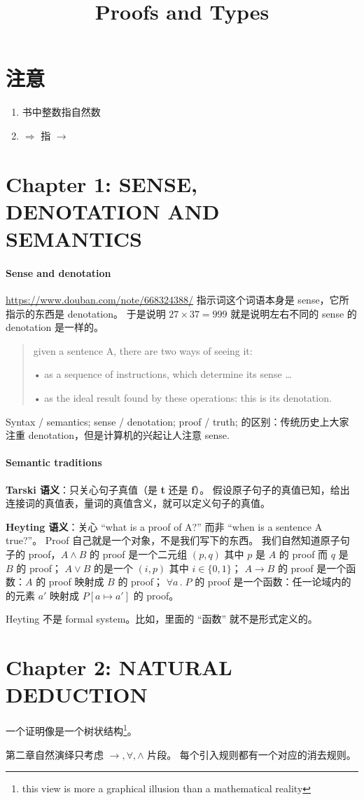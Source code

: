 \documentclass[a4paper]{article}
\title{Proofs and Types}
\author{}
\begin{document}
\maketitle

\section{注意}
\begin{enumerate}
	\item 书中整数指自然数
	\item $\Rightarrow$ 指 $\to$
\end{enumerate}

\section{Chapter 1: SENSE, DENOTATION AND SEMANTICS}
\paragraph{Sense and denotation}
\url{https://www.douban.com/note/668324388/} 指示词这个词语本身是 sense，它所指示的东西是 denotation。
于是说明 $27\times 37=999$ 就是说明左右不同的 sense 的 denotation 是一样的。
\begin{quote}
given a sentence A, there are two ways of seeing it:

• as a sequence of instructions, which determine its sense \ldots

• as the ideal result found by these operations: this is its denotation.
\end{quote}

Syntax / semantics; sense / denotation; proof / truth; 的区别：传统历史上大家注重 denotation，但是计算机的兴起让人注意 sense.

\paragraph{Semantic traditions}
\textbf{Tarski 语义}：只关心句子真值（是 \textbf{t} 还是 \textbf{f}）。
假设原子句子的真值已知，给出连接词的真值表，量词的真值含义，就可以定义句子的真值。

\textbf{Heyting 语义}：关心 ``what is a proof of A?'' 而非 ``when is a sentence A true?''。
Proof 自己就是一个对象，不是我们写下的东西。
我们自然知道原子句子的 proof，$A\land B$ 的 proof 是一个二元组 $(p, q)$ 其中 $p$ 是 $A$ 的 proof 而 $q$ 是 $B$ 的 proof；
$A \lor B$ 的是一个 $(i, p)$ 其中 $i\in\{0, 1\}$；
$A \to B$ 的 proof 是一个函数：$A$ 的 proof 映射成 $B$ 的 proof；
$\forall a\, .\;P$ 的 proof 是一个函数：任一论域内的的元素 $a'$ 映射成 $P[a\mapsto a']$ 的 proof。

Heyting 不是 formal system。比如，里面的 ``函数'' 就不是形式定义的。

\section{Chapter 2: NATURAL DEDUCTION}
一个证明像是一个树状结构\footnote{this view is more a graphical illusion than a mathematical reality}。

第二章自然演绎只考虑 $\to, \forall, \land$ 片段。
每个引入规则都有一个对应的消去规则。



%
%
\end{document}
